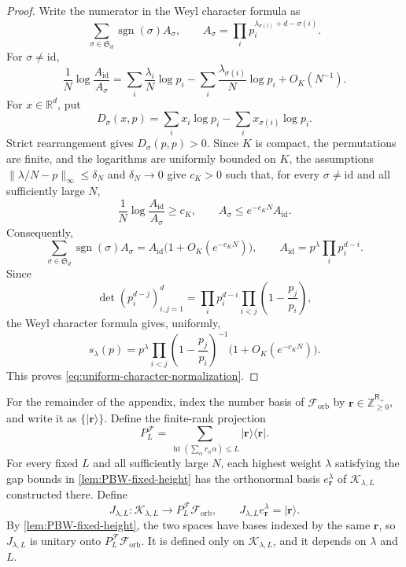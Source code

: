 \documentclass[11pt]{article}
\theoremstyle{remark}
\theoremstyle{plain}
\newcommand{\cF}{\mathcal F}
\newcommand{\ket}[1]{|#1\rangle}
\newcommand{\proj}[1]{|#1\rangle\!\langle #1|}
\begin{document}
\begin{proof}
Write the numerator in the Weyl character formula as
\[
  \sum_{\sigma\in\mathfrak S_d}\operatorname{sgn}(\sigma)A_\sigma,
  \qquad
  A_\sigma=\prod_i p_i^{\lambda_{\sigma(i)}+d-\sigma(i)}.
\]
For \(\sigma\ne\mathrm{id}\),
\[
  \frac1N\log\frac{A_{\mathrm{id}}}{A_\sigma}
  =\sum_i\frac{\lambda_i}{N}\log p_i
   -\sum_i\frac{\lambda_{\sigma(i)}}{N}\log p_i+O_K(N^{-1}).
\]
For \(x\in\mathbb R^d\), put
\[
  D_\sigma(x,p)
  =\sum_i x_i\log p_i-\sum_i x_{\sigma(i)}\log p_i.
\]
Strict rearrangement gives \(D_\sigma(p,p)>0\).  Since \(K\) is compact,
the permutations are finite, and the logarithms are uniformly bounded on
\(K\), the assumptions \(\|\lambda/N-p\|_\infty\le\delta_N\) and
\(\delta_N\to0\) give \(c_K>0\) such that, for every
\(\sigma\ne\mathrm{id}\) and all sufficiently large \(N\),
\[
  \frac1N\log\frac{A_{\mathrm{id}}}{A_\sigma}\ge c_K,
  \qquad
  A_\sigma\le e^{-c_KN}A_{\mathrm{id}}.
\]
Consequently,
\[
  \sum_{\sigma\in\mathfrak S_d}\operatorname{sgn}(\sigma)A_\sigma
  =A_{\mathrm{id}}\bigl(1+O_K(e^{-c_KN})\bigr),
  \qquad
  A_{\mathrm{id}}=p^\lambda\prod_i p_i^{d-i}.
\]
Since
\[
  \det(p_i^{d-j})_{i,j=1}^d
  =\prod_i p_i^{d-i}
   \prod_{i<j}\left(1-\frac{p_j}{p_i}\right),
\]
the Weyl character formula gives, uniformly,
\[
  s_\lambda(p)
  =p^\lambda
   \prod_{i<j}\left(1-\frac{p_j}{p_i}\right)^{-1}
   \bigl(1+O_K(e^{-c_KN})\bigr).
\]
This proves \eqref{eq:uniform-character-normalization}.
\end{proof}

For the remainder of the appendix, index the number basis of
\(\cF_{\mathrm{orb}}\) by
\(\mathbf r\in\mathbb Z_{\ge0}^{\mathsf R_+}\), and write it as
\(\{\ket{\mathbf r}\}\).  Define the finite-rank projection
\begin{equation}\label{eq:Fock-height-projection}
  P_L^{\cF}
  =\sum_{\operatorname{ht}(\sum_\alpha r_\alpha\alpha)\le L}
    \proj{\mathbf r}.
\end{equation}
For every fixed \(L\) and all sufficiently large \(N\), each highest
weight \(\lambda\) satisfying the gap bounds in
\cref{lem:PBW-fixed-height} has the orthonormal basis
\(e_{\mathbf r}^\lambda\) of \(\mathcal K_{\lambda,L}\) constructed there.
Define
\begin{equation}\label{eq:finite-coordinate-unitary}
  J_{\lambda,L}:\mathcal K_{\lambda,L}\longrightarrow
  P_L^{\cF}\cF_{\mathrm{orb}},
  \qquad
  J_{\lambda,L}e_{\mathbf r}^\lambda=\ket{\mathbf r}.
\end{equation}
By \cref{lem:PBW-fixed-height}, the two spaces have bases indexed
by the same \(\mathbf r\), so \(J_{\lambda,L}\) is unitary onto
\(P_L^{\cF}\cF_{\mathrm{orb}}\).  It is defined only on
\(\mathcal K_{\lambda,L}\), and it depends on \(\lambda\) and \(L\).
\end{document}
